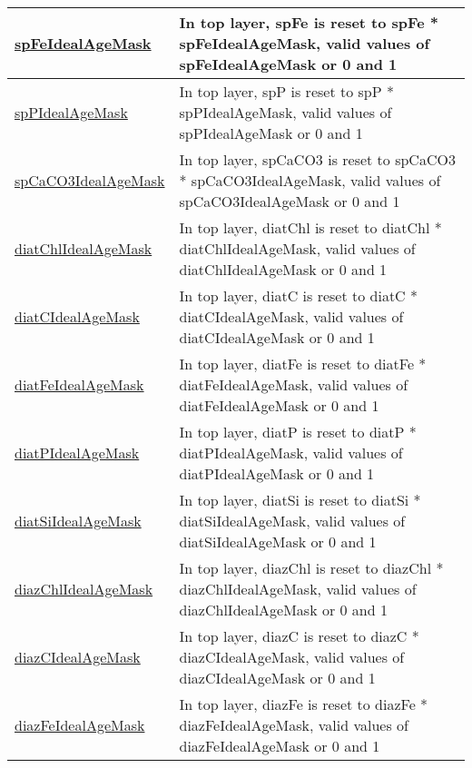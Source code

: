 {\begin{center}
\begin{longtable}{| p{2.0in} | p{4.0in} |}
    \hline
    \hyperref[subsec:var_sec_forcing_spFeIdealAgeMask]{spFeIdealAgeMask} & In top layer, spFe is reset to spFe * spFeIdealAgeMask, valid values of spFeIdealAgeMask or 0 and 1 \\
    \hline
    \hyperref[subsec:var_sec_forcing_spPIdealAgeMask]{spPIdealAgeMask} & In top layer, spP is reset to spP * spPIdealAgeMask, valid values of spPIdealAgeMask or 0 and 1 \\
    \hline
    \hyperref[subsec:var_sec_forcing_spCaCO3IdealAgeMask]{spCaCO3IdealAgeMask} & In top layer, spCaCO3 is reset to spCaCO3 * spCaCO3IdealAgeMask, valid values of spCaCO3IdealAgeMask or 0 and 1 \\
    \hline
    \hyperref[subsec:var_sec_forcing_diatChlIdealAgeMask]{diatChlIdealAgeMask} & In top layer, diatChl is reset to diatChl * diatChlIdealAgeMask, valid values of diatChlIdealAgeMask or 0 and 1 \\
    \hline
    \hyperref[subsec:var_sec_forcing_diatCIdealAgeMask]{diatCIdealAgeMask} & In top layer, diatC is reset to diatC * diatCIdealAgeMask, valid values of diatCIdealAgeMask or 0 and 1 \\
    \hline
    \hyperref[subsec:var_sec_forcing_diatFeIdealAgeMask]{diatFeIdealAgeMask} & In top layer, diatFe is reset to diatFe * diatFeIdealAgeMask, valid values of diatFeIdealAgeMask or 0 and 1 \\
    \hline
    \hyperref[subsec:var_sec_forcing_diatPIdealAgeMask]{diatPIdealAgeMask} & In top layer, diatP is reset to diatP * diatPIdealAgeMask, valid values of diatPIdealAgeMask or 0 and 1 \\
    \hline
    \hyperref[subsec:var_sec_forcing_diatSiIdealAgeMask]{diatSiIdealAgeMask} & In top layer, diatSi is reset to diatSi * diatSiIdealAgeMask, valid values of diatSiIdealAgeMask or 0 and 1 \\
    \hline
    \hyperref[subsec:var_sec_forcing_diazChlIdealAgeMask]{diazChlIdealAgeMask} & In top layer, diazChl is reset to diazChl * diazChlIdealAgeMask, valid values of diazChlIdealAgeMask or 0 and 1 \\
    \hline
    \hyperref[subsec:var_sec_forcing_diazCIdealAgeMask]{diazCIdealAgeMask} & In top layer, diazC is reset to diazC * diazCIdealAgeMask, valid values of diazCIdealAgeMask or 0 and 1 \\
    \hline
    \hyperref[subsec:var_sec_forcing_diazFeIdealAgeMask]{diazFeIdealAgeMask} & In top layer, diazFe is reset to diazFe * diazFeIdealAgeMask, valid values of diazFeIdealAgeMask or 0 and 1 \\

\end{longtable}
\end{center}}

